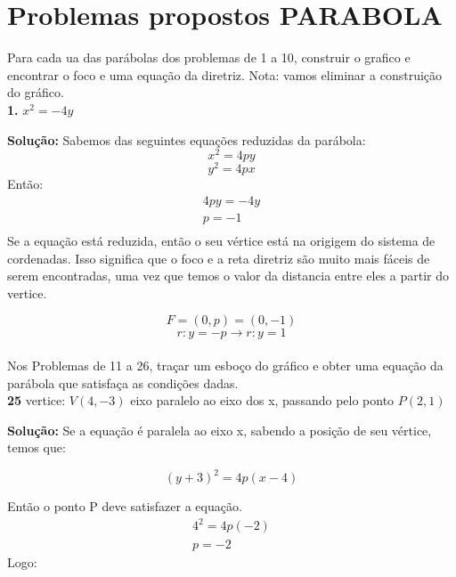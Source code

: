 \section{Problemas propostos PARABOLA}

Para cada ua das parábolas dos problemas de 1 a 10, construir o grafico e encontrar o foco e uma equação da diretriz.
Nota: vamos eliminar a construição do gráfico. \\
\textbf{1. } $x^2 = -4y$

\textbf{Solução:} Sabemos das seguintes equações reduzidas da parábola:
\begin{equation}
    x^2 = 4py
\end{equation}
\begin{equation}
    y^2 = 4px
\end{equation}
Então:
\begin{equation}
    \begin{split}
        4py = -4y \\
        p = -1 \\
    \end{split}
\end{equation}
Se a equação está reduzida, então o seu vértice está na origigem do sistema de cordenadas. Isso significa que o foco e a reta diretriz são muito mais fáceis de serem encontradas, uma vez que temos o valor da distancia entre eles a partir do vertice.

\begin{equation}
    F = (0, p) = (0, -1)
\end{equation}
\begin{equation}
    r: y = -p \longrightarrow r: y = 1
\end{equation} \\

Nos Problemas de 11 a 26, traçar um esboço do gráfico e obter uma equação da parábola que satisfaça 
as condições dadas. \\

\textbf{25} vertice: $V(4, -3)$ eixo paralelo ao eixo dos x, passando pelo ponto $P(2, 1)$

\textbf{Solução:} 
Se a equação é paralela ao eixo x, sabendo a posição de seu vértice, temos que:

\begin{equation}
    (y+3)^2 = 4p(x-4)
\end{equation}

Então o ponto P deve satisfazer a equação.
\begin{equation}
    \begin{split}
        4^2 = 4p(-2) \\
        p = -2
    \end{split}
\end{equation}
Logo:

